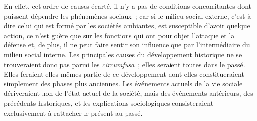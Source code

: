 \documentclass[french,twoside]{book} %
\begin{document}
En effet, cet ordre de causes écarté, il n’y a pas de conditions concomitantes dont puissent dépendre les phénomènes sociaux ; car si le milieu social externe, c’est-à-dire celui qui est formé par les sociétés ambiantes, est susceptible d’avoir quelque action, ce n’est guère que sur les fonctions qui ont pour objet l’attaque et la défense et, de plus, il ne peut faire sentir son influence que par l’intermédiaire du milieu social interne. Les principales causes du développement historique ne se trouveraient donc pas parmi les {\itshape circumfusa} ; elles seraient toutes dans le passé. Elles feraient elles-mêmes partie de ce développement dont elles constitueraient simplement des phases plus anciennes. Les événements actuels de la vie sociale dériveraient non de l’état actuel de la société, mais des événements antérieurs, des précédents historiques, et les explications sociologiques consisteraient exclusivement à rattacher le présent au passé.\par
\end{document}
